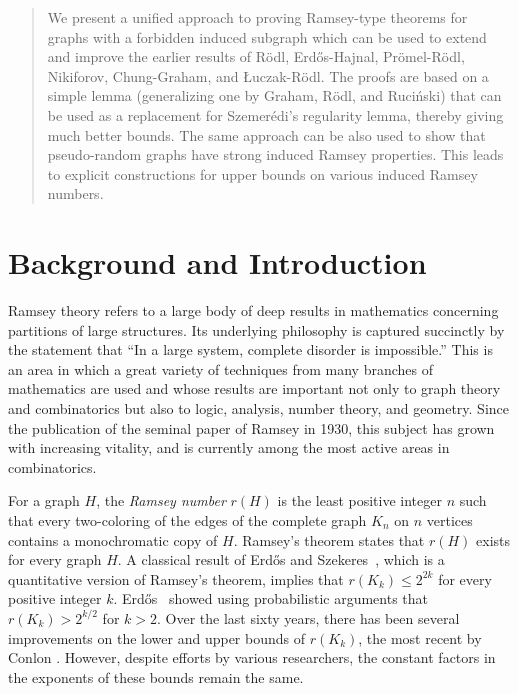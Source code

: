 \documentclass[11pt]{article}
\begin{document}
\date{}

\maketitle

\begin{abstract}
We present a unified approach to proving Ramsey-type theorems for
graphs with a forbidden induced subgraph which can be used to extend
and improve the earlier results of R\"odl, Erd\H{o}s-Hajnal,
Pr\"omel-R\"odl, Nikiforov, Chung-Graham, and \L uczak-R\"odl. The
proofs are based on a simple lemma (generalizing one by Graham,
R\"odl, and Ruci\'nski) that can be used as a replacement for
Szemer\'edi's regularity lemma, thereby giving much better bounds.
The same approach can be also used to show that pseudo-random graphs
have strong induced Ramsey properties. This leads to explicit
constructions for upper bounds on various induced Ramsey numbers.
\end{abstract}

\section{Background and Introduction}

Ramsey theory refers to a large body of deep results in mathematics
concerning partitions of large structures. Its underlying philosophy
is captured succinctly by the statement that ``In a large system,
complete disorder is impossible.'' This is an area in which a great
variety of techniques from many branches of mathematics are used and
whose results are important not only to graph theory and
combinatorics but also to logic, analysis, number theory, and
geometry. Since the publication of the seminal paper of Ramsey
\cite{Ra} in 1930, this subject has grown with increasing vitality,
and is currently among the most active areas in combinatorics.

For a graph $H$, the {\it Ramsey number} $r(H)$ is the least
positive integer $n$ such that every two-coloring of the edges of
the complete graph $K_n$ on $n$ vertices contains a monochromatic copy
of $H$. Ramsey's theorem states that $r(H)$ exists for every graph
$H$. A classical result of Erd\H{o}s and Szekeres~\cite{ErSz}, which
is a quantitative version of Ramsey's theorem, implies that $r(K_k)
\leq 2^{2k}$ for every positive integer $k$. Erd\H{o}s~\cite{Er}
showed using probabilistic arguments that $r(K_k) > 2^{k/2}$ for $k
> 2$. Over the last sixty years, there has been several
improvements on the lower and upper bounds of $r(K_k)$, the most
recent by Conlon \cite{Co}. However, despite efforts by various
researchers, the constant factors in the exponents of these bounds
remain the same.
\end{document}
